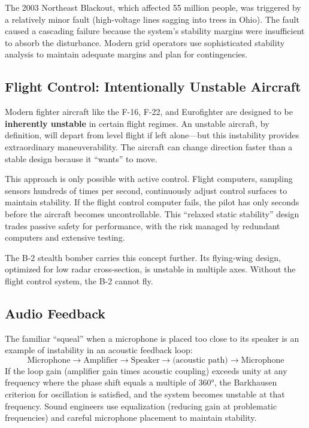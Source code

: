 The 2003 Northeast Blackout, which affected 55 million people, was triggered by a relatively minor fault (high-voltage lines sagging into trees in Ohio). The fault caused a cascading failure because the system's stability margins were insufficient to absorb the disturbance. Modern grid operators use sophisticated stability analysis to maintain adequate margins and plan for contingencies.

\subsection{Flight Control: Intentionally Unstable Aircraft}

Modern fighter aircraft like the F-16, F-22, and Eurofighter are designed to be \textbf{inherently unstable} in certain flight regimes. An unstable aircraft, by definition, will depart from level flight if left alone---but this instability provides extraordinary maneuverability. The aircraft can change direction faster than a stable design because it ``wants'' to move.

This approach is only possible with active control. Flight computers, sampling sensors hundreds of times per second, continuously adjust control surfaces to maintain stability. If the flight control computer fails, the pilot has only seconds before the aircraft becomes uncontrollable. This ``relaxed static stability'' design trades passive safety for performance, with the risk managed by redundant computers and extensive testing.

The B-2 stealth bomber carries this concept further. Its flying-wing design, optimized for low radar cross-section, is unstable in multiple axes. Without the flight control system, the B-2 cannot fly.

\subsection{Audio Feedback}

The familiar ``squeal'' when a microphone is placed too close to its speaker is an example of instability in an acoustic feedback loop:
\[
\text{Microphone} \to \text{Amplifier} \to \text{Speaker} \to \text{(acoustic path)} \to \text{Microphone}
\]
If the loop gain (amplifier gain times acoustic coupling) exceeds unity at any frequency where the phase shift equals a multiple of $360°$, the Barkhausen criterion for oscillation is satisfied, and the system becomes unstable at that frequency. Sound engineers use equalization (reducing gain at problematic frequencies) and careful microphone placement to maintain stability.


